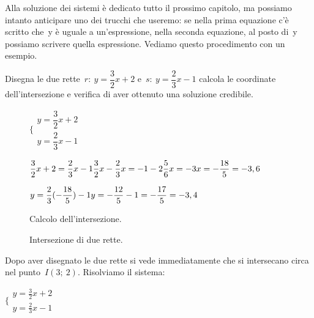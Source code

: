 \begin{exrig}
Alla soluzione dei sistemi è dedicato tutto il prossimo capitolo, ma possiamo 
intanto anticipare uno dei trucchi che useremo: se nella prima equazione c'è 
scritto che~y è uguale a un'espressione, nella seconda equazione, al posto 
di~y possiamo scrivere quella espressione. Vediamo questo procedimento con un 
esempio.

 \begin{esempio}
  Disegna le due rette~$r:~y = \dfrac{3}{2} x +2$ e~$s:~y = \dfrac{2}{3} x -1$ 
  calcola le coordinate dell'intersezione e verifica di aver
  ottenuto una soluzione credibile.
\begin{inaccessibleblock}
 \begin{figure}[h]
 \centering
 \begin{minipage}[]{.60\textwidth}
   $\bigg \{
     \begin{array}{l}
      y = \dfrac{3}{2} x +2 \\
      y = \dfrac{2}{3} x -1
     \end{array}
   $
  
   $\dfrac{3}{2} x +2 = \dfrac{2}{3} x -1 \newline
    \dfrac{3}{2} x - \dfrac{2}{3} x = -1 -2 \newline
    \dfrac{5}{6} x = -3 \newline
    x = -\dfrac{18}{5} = -3,6$
   
   $y = \dfrac{2}{3} (-\dfrac{18}{5}) -1 \newline
    y = - \dfrac{12}{5} -1 = - \dfrac{17}{5} = -3,4$
  \caption{Calcolo dell'intersezione.}\label{fig:elementi}
 \end{minipage}
 \begin{minipage}[]{.30\textwidth}
   \centering
  \caption{Intersezione di due rette.}\label{fig:intersezione02}
 \end{minipage}
\end{figure}
\end{inaccessibleblock}
 \end{esempio}
 
\vspace{-12pt}

   Dopo aver disegnato le due rette si vede immediatamente che si intersecano 
   circa nel punto~$I(3;~2)$. Risolviamo il sistema:
   
   $\bigg \{
     \begin{array}{l}
      y = \frac{3}{2} x +2 \\
      y = \frac{2}{3} x -1
     \end{array}
   $
  

\end{exrig}
